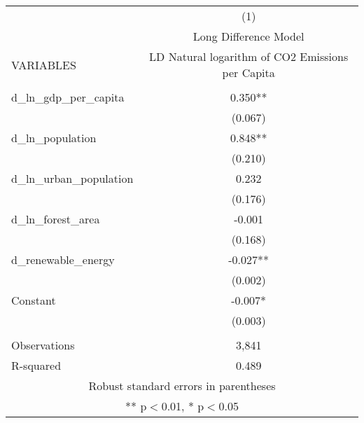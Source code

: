 \begin{tabular}{lc} \hline
 & (1) \\
 & Long Difference Model \\
VARIABLES & LD Natural logarithm of CO2 Emissions per Capita \\ \hline
 &  \\
d\_ln\_gdp\_per\_capita & 0.350** \\
 & (0.067) \\
d\_ln\_population & 0.848** \\
 & (0.210) \\
d\_ln\_urban\_population & 0.232 \\
 & (0.176) \\
d\_ln\_forest\_area & -0.001 \\
 & (0.168) \\
d\_renewable\_energy & -0.027** \\
 & (0.002) \\
Constant & -0.007* \\
 & (0.003) \\
 &  \\
Observations & 3,841 \\
 R-squared & 0.489 \\ \hline
\multicolumn{2}{c}{ Robust standard errors in parentheses} \\
\multicolumn{2}{c}{ ** p$<$0.01, * p$<$0.05} \\
\end{tabular}
